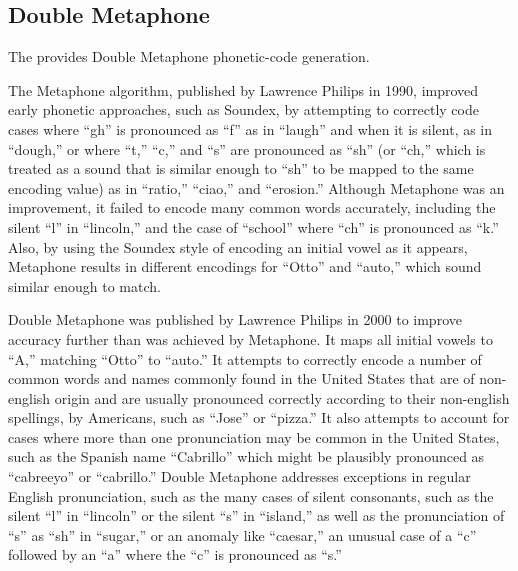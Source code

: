 \documentclass[10pt,twoside,english,pdftex]{article}
\begin{document}

\T\markright{}%
\T\pagestyle{plain}
\T\clearpage
\W{}
\T\pagestyle{fancy}
\T\thispagestyle{fancybottom}
\T\global\def\fnlastname{ }%
\subsection{Double Metaphone}
\label{sec:double-metaphone}%

%
%
%
The   provides Double Metaphone
phonetic-code generation.

The Metaphone algorithm, published by Lawrence Philips in 1990, improved early
phonetic approaches, such as Soundex, by attempting to correctly code cases
where ``gh'' is pronounced as ``f'' as in ``laugh'' and when it is silent, as
in ``dough,'' or where ``t,'' ``c,'' and ``s'' are pronounced as ``sh'' (or
``ch,'' which is treated as a sound that is similar enough to ``sh'' to be
mapped to the same encoding value) as in ``ratio,'' ``ciao,'' and ``erosion.''
Although Metaphone was an improvement, it failed to encode many common words
accurately, including the silent ``l'' in ``lincoln,'' and the case of
``school'' where ``ch'' is pronounced as ``k.'' Also, by using the Soundex
style of encoding an initial vowel as it appears, Metaphone results in
different encodings for ``Otto'' and ``auto,'' which sound similar enough to
match.

Double Metaphone was published by Lawrence Philips in 2000 to improve accuracy
further than was achieved by Metaphone. It maps all initial vowels to ``A,''
matching ``Otto'' to ``auto.'' It attempts to correctly encode a number of
common words and names commonly found in the United States that are of
non-english origin and are usually pronounced correctly according to their
non-english spellings, by Americans, such as ``Jose'' or ``pizza.''  It also
attempts to account for cases where more than one pronunciation may be common
in the United States, such as the Spanish name ``Cabrillo'' which might be
plausibly pronounced as ``cabreeyo'' or ``cabrillo.'' Double Metaphone
addresses exceptions in regular English pronunciation, such as the many cases
of silent consonants, such as the silent ``l'' in ``lincoln'' or the silent
``s'' in ``island,'' as well as the pronunciation of ``s'' as ``sh'' in
``sugar,'' or an anomaly like ``caesar,'' an unusual case of a ``c'' followed
by an ``a'' where the ``c'' is pronounced as ``s.''
\end{document}
